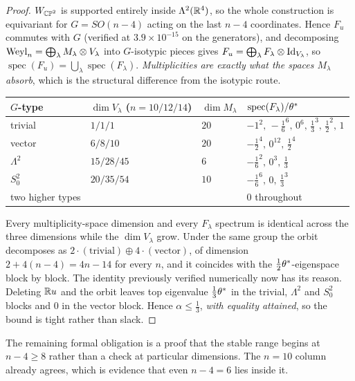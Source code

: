 \begin{proof}
$W_{\mathbb{CP}^2}$ is supported entirely inside $\Lambda^2(\mathbb{R}^4)$, so the whole construction is equivariant for $G=SO(n-4)$ acting on the last $n-4$ coordinates. Hence $F_u$ commutes with $G$ (verified at $3.9\times10^{-15}$ on the generators), and decomposing $\mathrm{Weyl}_n=\bigoplus_\lambda M_\lambda\otimes V_\lambda$ into $G$-isotypic pieces gives $F_u=\bigoplus_\lambda F_\lambda\otimes\mathrm{Id}_{V_\lambda}$, so $\operatorname{spec}(F_u)=\bigcup_\lambda\operatorname{spec}(F_\lambda)$. \emph{Multiplicities are exactly what the spaces $M_\lambda$ absorb}, which is the structural difference from the isotypic route.

\begin{center}
\begin{tabular}{@{}llll@{}}
\toprule
$G$-type & $\dim V_\lambda$ ($n=10/12/14$) & $\dim M_\lambda$ & $\operatorname{spec}(F_\lambda)/\theta^{*}$ \\
\midrule
trivial   & $1/1/1$     & $20$ & $-1^{2},\,-\tfrac16^{6},\,0^{6},\,\tfrac13^{3},\,\tfrac12^{2},\,1$ \\
vector    & $6/8/10$    & $20$ & $-\tfrac12^{4},\,0^{12},\,\tfrac12^{4}$ \\
$\Lambda^2$ & $15/28/45$ & $6$  & $-\tfrac16^{2},\,0^{3},\,\tfrac13$ \\
$S^2_0$   & $20/35/54$  & $10$ & $-\tfrac16^{6},\,0,\,\tfrac13^{3}$ \\
two higher types & & & $0$ throughout \\
\bottomrule
\end{tabular}
\end{center}

Every multiplicity-space dimension and every $F_\lambda$ spectrum is identical across the three dimensions while the $\dim V_\lambda$ grow. Under the same group the orbit decomposes as $2\cdot(\text{trivial})\oplus4\cdot(\text{vector})$, of dimension $2+4(n-4)=4n-14$ for every $n$, and it coincides with the $\tfrac12\theta^{*}$-eigenspace block by block. The identity previously verified numerically now has its reason. Deleting $\mathbb{R} u$ and the orbit leaves top eigenvalue $\tfrac13\theta^{*}$ in the trivial, $\Lambda^2$ and $S^2_0$ blocks and $0$ in the vector block. Hence $\alpha\le\tfrac13$, \emph{with equality attained}, so the bound is tight rather than slack.
\end{proof}

The remaining formal obligation is a proof that the stable range begins at $n-4\ge8$ rather than a check at particular dimensions. The $n=10$ column already agrees, which is evidence that even $n-4=6$ lies inside it.

